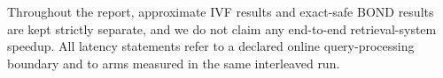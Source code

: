 Throughout the report, approximate IVF results and exact-safe BOND results 
are kept strictly separate, and we do not claim any end-to-end retrieval-system speedup. 
All latency statements refer to a declared online query-processing boundary 
and to arms measured in the same interleaved run.


